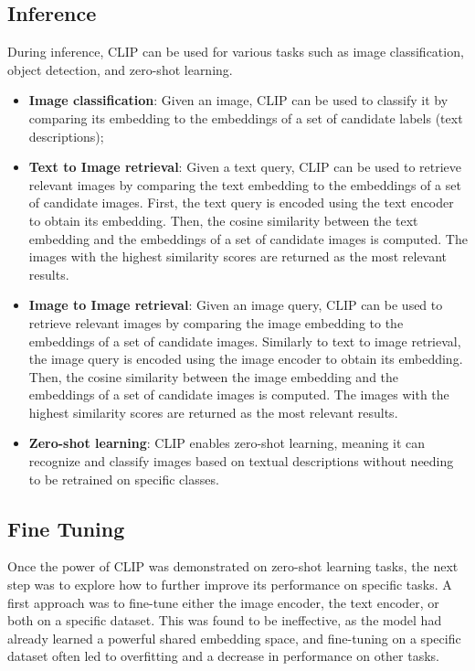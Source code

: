 \subsection{Inference}
During inference, CLIP can be used for various tasks such as image classification, object detection, and zero-shot learning.
\begin{itemize}
    \item \textbf{Image classification}: Given an image, CLIP can be used to classify it by comparing its embedding to the embeddings of a set of candidate labels (text descriptions);
    \item \textbf{Text to Image retrieval}: Given a text query, CLIP can be used to retrieve relevant images by comparing the text embedding to the embeddings of a set of candidate images.
    First, the text query is encoded using the text encoder to obtain its embedding. Then, the cosine similarity between the text embedding and the embeddings of a set of candidate images is computed. 
    The images with the highest similarity scores are returned as the most relevant results.
    \item \textbf{Image to Image retrieval}: Given an image query, CLIP can be used to retrieve relevant images by comparing the image embedding to the embeddings of a set of candidate images.
    Similarly to text to image retrieval, the image query is encoded using the image encoder to obtain its embedding. Then, the cosine similarity between the image embedding and the embeddings of a set of candidate images is computed.
    The images with the highest similarity scores are returned as the most relevant results.
    \item \textbf{Zero-shot learning}: CLIP enables zero-shot learning, meaning it can recognize and classify images based on textual descriptions without needing to be retrained on specific classes.
\end{itemize}

\subsection{Fine Tuning}
Once the power of CLIP was demonstrated on zero-shot learning tasks, the next step was to explore how to further improve its performance on specific tasks.
A first approach was to fine-tune either the image encoder, the text encoder, or both on a specific dataset.
This was found to be ineffective, as the model had already learned a powerful shared embedding space, and fine-tuning on a specific dataset often led 
to overfitting and a decrease in performance on other tasks.

